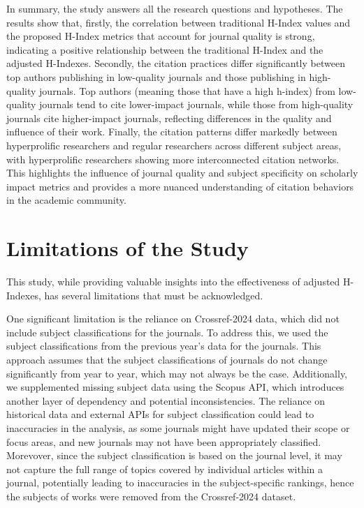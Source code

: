 In summary, the study answers all the research questions and hypotheses. The
results show that, firstly, the correlation between traditional H-Index values
and the proposed H-Index metrics that account for journal quality is strong,
indicating a positive relationship between the traditional H-Index and the
adjusted H-Indexes. Secondly, the citation practices differ significantly
between top authors publishing in low-quality journals and those publishing in
high-quality journals. Top authors (meaning those that have a high h-index)
from low-quality journals tend to cite lower-impact journals, while those from
high-quality journals cite higher-impact journals, reflecting differences in
the quality and influence of their work. Finally, the citation patterns differ
markedly between hyperprolific researchers and regular researchers across
different subject areas, with hyperprolific researchers showing more
interconnected citation networks. This highlights the influence of journal
quality and subject specificity on scholarly impact metrics and provides a more
nuanced understanding of citation behaviors in the academic community. %


\section{Limitations of the Study}

This study, while providing valuable insights into the effectiveness of
adjusted H-Indexes, has several limitations that must be acknowledged.

One significant limitation is the reliance on Crossref-2024 data, which did not
include subject classifications for the journals. To address this, we used the
subject classifications from the previous year’s data for the journals. This
approach assumes that the subject classifications of journals do not change
significantly from year to year, which may not always be the case.
Additionally, we supplemented missing subject data using the Scopus API, which
introduces another layer of dependency and potential inconsistencies. The
reliance on historical data and external APIs for subject classification could
lead to inaccuracies in the analysis, as some journals might have updated their
scope or focus areas, and new journals may not have been appropriately
classified. Morevover, since the subject classification is based on the journal
level, it may not capture the full range of topics covered by individual
articles within a journal, potentially leading to inaccuracies in the
subject-specific rankings, hence the subjects of works were removed from the
Crossref-2024 dataset.

